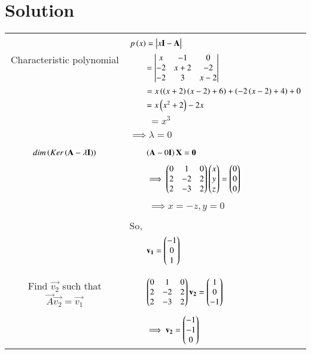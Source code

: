 \documentclass[journal,12pt]{IEEEtran}
\begin{document}
\section{\textbf{Solution}}
\renewcommand{\thetable}{2}
\begin{longtable}{|c|l|}
    \hline
	\multirow{3}{*}{Characteristic polynomial} 
	& \\
	& $p\brak{x}=\mydet{x\Vec{I}-\Vec{A}}$\\
	& $\qquad = \begin{vmatrix}x&-1&0\\-2&x+2&-2\\-2&3&x-2\end{vmatrix}$\\
	& $\qquad=x\left(\left(x+2\right)\left(x-2\right)+6\right)+\left(-2\left(x-2\right)+4\right)+0$\\
	&$\qquad=x\left(x^2+2\right)-2x$\\
	&$\qquad=x^3$\\
	&\\
	&$\implies \lambda=0$\\
	&\\
	\hline
	\multirow{3}{*}{$dim\brak{Ker\brak{\vec{A}-\lambda\Vec{I}}}$} & \\
	&$\qquad\left(\mathbf{A}-0\mathbf{I}\right)\mathbf{X}=\mathbf{0}$\\
	&\\
	& $\qquad\implies \begin{pmatrix}0&1&0\\2&-2&2\\2&-3&2\end{pmatrix}\begin{pmatrix}x\\y\\z\end{pmatrix}=\begin{pmatrix}0\\0\\0\end{pmatrix}$\\
	&\\
	& $\qquad\implies x=-z, y=0$\\
	&\\
	& So,\\
	&$\qquad\mathbf{v_1}=\begin{pmatrix}-1\\0\\1\end{pmatrix}$\\
	&\\
	\hline
	\multirow{3}{*}{Find $\vec{v_2}$ such that $\vec{A}\vec{v_2}=\vec{v_1}$}&\\ &$\qquad\begin{pmatrix}0&1&0\\2&-2&2\\2&-3&2\end{pmatrix}\mathbf{v_2}=\begin{pmatrix}1\\0\\-1\end{pmatrix}$\\
	&\\
	& $\qquad\implies \mathbf{v_2}=\begin{pmatrix}-1\\-1\\0\end{pmatrix}$\\

\end{longtable}
\end{document}
